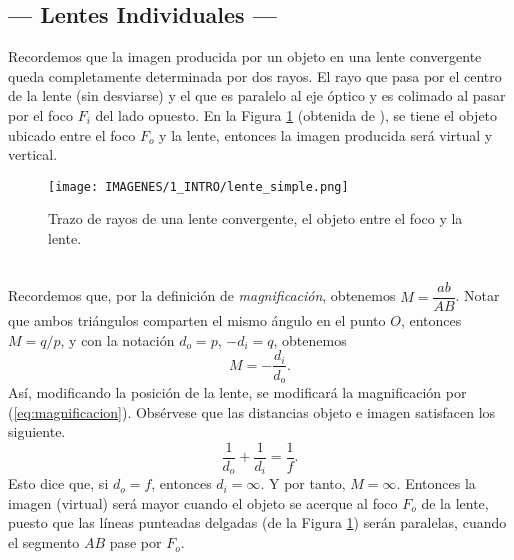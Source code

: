 \documentclass[10pt,a4paper]{article}
\begin{document}
\subsection{--- Lentes Individuales ---} %
\label{sub:lentes_individuales}
Recordemos que la imagen producida por un objeto en una lente convergente queda completamente determinada por dos rayos.
El rayo que pasa por el centro de la lente (sin desviarse) y el que es paralelo al eje óptico y es colimado al pasar por el foco \(F_i\) del lado opuesto.
En la Figura \ref{fig:lente} (obtenida de ), se tiene el objeto ubicado entre el foco \(F_o\) y la lente, entonces la imagen producida será virtual y vertical.
\begin{figure}[ht]
	\centering
	\texttt{[image: IMAGENES/1\_INTRO/lente\_simple.png]}
	\caption{Trazo de rayos de una lente convergente, el objeto entre el foco y la lente.}
	\label{fig:lente}
\end{figure}\\
Recordemos que, por la definición de \textit{magnificación}, obtenemos \(M = \dfrac{ab}{AB}\).
Notar que ambos triángulos comparten el mismo ángulo en el punto \(O\), entonces \(M=q/p\), y con la notación \(d_o=p\), \(-d_i=q\), obtenemos
\begin{equation}
	M = -\dfrac{d_i}{d_o}.
	\label{eq:magnificacion}
\end{equation}
Así, modificando la posición de la lente, se modificará la magnificación por (\ref{eq:magnificacion}).
Obsérvese que las distancias objeto e imagen satisfacen los siguiente.
\begin{equation}
	\dfrac{1}{d_o} + \dfrac{1}{d_i} = \dfrac{1}{f}.
	\label{eq:ley_lentes}
\end{equation}
Esto dice que, si \(d_o=f\), entonces \(d_i= \infty\). Y por tanto, \(M= \infty\).
Entonces la imagen (virtual) será mayor cuando el objeto se acerque al foco \(F_o\) de la lente, puesto que las líneas punteadas delgadas (de la Figura \ref{fig:lente}) serán paralelas, cuando el segmento \(AB\) pase por \(F_o\).
\end{document}
